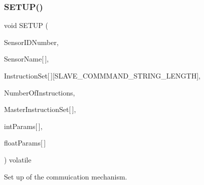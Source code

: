 \subsubsection{\texorpdfstring{SETUP()}{SETUP()}}
{\footnotesize\ttfamily void S\+E\+T\+UP (\begin{DoxyParamCaption}\item[{const int}]{Sensor\+I\+D\+Number,  }\item[{volatile char}]{Sensor\+Name\mbox{[}$\,$\mbox{]},  }\item[{volatile char}]{Instruction\+Set\mbox{[}$\,$\mbox{]}\mbox{[}\+S\+L\+A\+V\+E\+\_\+\+C\+O\+M\+M\+M\+A\+N\+D\+\_\+\+S\+T\+R\+I\+N\+G\+\_\+\+L\+E\+N\+G\+T\+H\mbox{]},  }\item[{const int}]{Number\+Of\+Instructions,  }\item[{volatile \mbox{\hyperlink{_s_p_i___instruction_set_8h_a949ec019a0f52780dcdd7d5a5ba73e47}{s\+Instruct}}}]{Master\+Instruction\+Set\mbox{[}$\,$\mbox{]},  }\item[{volatile int}]{int\+Params\mbox{[}$\,$\mbox{]},  }\item[{volatile float}]{float\+Params\mbox{[}$\,$\mbox{]} }\end{DoxyParamCaption}) volatile}



Set up of the commuication mechanism. 

